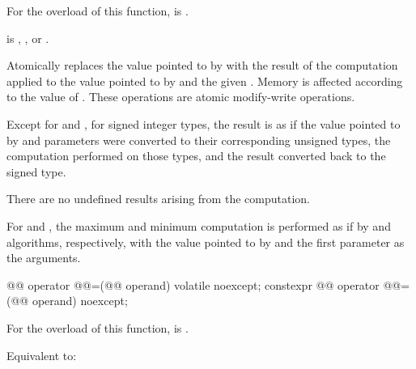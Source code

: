 \begin{itemdescr}
\pnum
\constraints
For the  overload of this function,
 is .

\pnum
\expects
{} is
,
, or
.

\pnum
\effects
Atomically replaces the value pointed to by 
with the result of the computation applied to
the value pointed to by  and the given .
Memory is affected according to the value of .
These operations are atomic modify-write operations.

\pnum
\remarks
Except for  and ,
for signed integer types, the result is as if
the value pointed to by  and parameters
were converted to their corresponding unsigned types,
the computation performed on those types, and
the result converted back to the signed type.
\begin{note}
There are no undefined results arising from the computation.
\end{note}
For  and ,
the maximum and minimum computation is performed
as if by  and  algorithms, respectively,
with the value pointed to by  and the first parameter as the arguments.
\end{itemdescr}

%
%
%
%
%
%
%
\begin{itemdecl}
@@ operator @@=(@@ operand) volatile noexcept;
constexpr @@ operator @@=(@@ operand) noexcept;
\end{itemdecl}

\begin{itemdescr}
\pnum
\constraints
For the  overload of this function,
 is .

\pnum
\effects
Equivalent to: 
\end{itemdescr}

